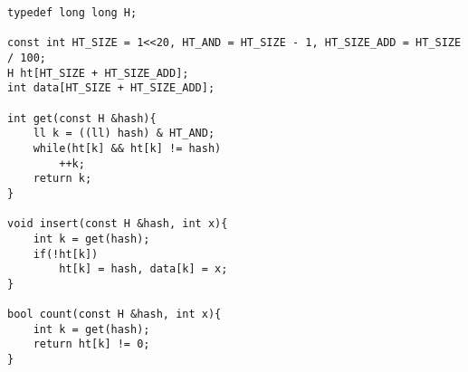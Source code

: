 \begin{verbatim}
typedef long long H;

const int HT_SIZE = 1<<20, HT_AND = HT_SIZE - 1, HT_SIZE_ADD = HT_SIZE / 100;
H ht[HT_SIZE + HT_SIZE_ADD];
int data[HT_SIZE + HT_SIZE_ADD];

int get(const H &hash){
	ll k = ((ll) hash) & HT_AND;
	while(ht[k] && ht[k] != hash)
		++k;
	return k;	
}

void insert(const H &hash, int x){
	int k = get(hash);
	if(!ht[k])
		ht[k] = hash, data[k] = x;
}

bool count(const H &hash, int x){
	int k = get(hash);
	return ht[k] != 0;
}
\end{verbatim}
